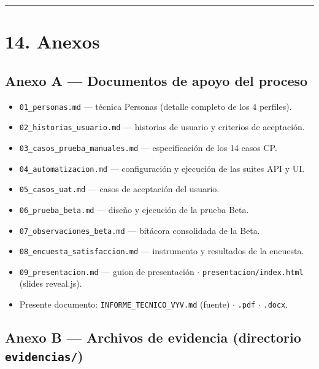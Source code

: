 \documentclass[11pt,a4paper]{article}
\begin{document}
\hrule\vspace{0.4em}


\section*{14. Anexos}


\subsection*{Anexo A --- Documentos de apoyo del proceso}


\begin{itemize}[leftmargin=*]
\item \texttt{01\_personas.md} --- técnica Personas (detalle completo de los 4 perfiles).
\item \texttt{02\_historias\_usuario.md} --- historias de usuario y criterios de aceptación.
\item \texttt{03\_casos\_prueba\_manuales.md} --- especificación de los 14 casos CP.
\item \texttt{04\_automatizacion.md} --- configuración y ejecución de las suites API y UI.
\item \texttt{05\_casos\_uat.md} --- casos de aceptación del usuario.
\item \texttt{06\_prueba\_beta.md} --- diseño y ejecución de la prueba Beta.
\item \texttt{07\_observaciones\_beta.md} --- bitácora consolidada de la Beta.
\item \texttt{08\_encuesta\_satisfaccion.md} --- instrumento y resultados de la encuesta.
\item \texttt{09\_presentacion.md} --- guion de presentación {$\cdot$} \texttt{presentacion/index.html} (slides reveal.js).
\item Presente documento: \texttt{INFORME\_TECNICO\_VYV.md} (fuente) {$\cdot$} \texttt{.pdf} {$\cdot$} \texttt{.docx}.
\end{itemize}


\subsection*{Anexo B --- Archivos de evidencia (directorio \texttt{evidencias/})}
\end{document}
